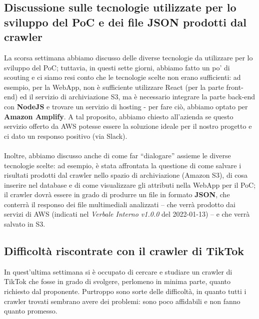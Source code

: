 \subsection{Discussione sulle tecnologie utilizzate per lo sviluppo del PoC e dei file JSON prodotti dal crawler}

La scorsa settimana abbiamo discusso delle diverse tecnologie da utilizzare per lo sviluppo del PoC; tuttavia, in questi sette giorni, abbiamo fatto un po' di scouting e ci siamo resi conto che le tecnologie scelte non erano sufficienti: ad esempio, per la WebApp, non è sufficiente utilizzare React (per la parte front-end) ed il servizio di archiviazione S3, ma è necessario integrare la parte back-end con \textbf{NodeJS} e trovare un servizio di hosting - per fare ciò, abbiamo optato per \textbf{Amazon Amplify}. A tal proposito, abbiamo chiesto all'azienda se questo servizio offerto da AWS potesse essere la soluzione ideale per il nostro progetto e ci dato un responso positivo (via Slack).
\\ \\
Inoltre, abbiamo discusso anche di come far “dialogare” assieme le diverse tecnologie scelte: ad esempio, è stata affrontata la questione di come salvare i risultati prodotti dal crawler nello spazio di archiviazione (Amazon S3), di cosa inserire nel database e di come visualizzare gli attributi nella WebApp per il PoC; il crawler dovrà essere in grado di produrre un file in formato \textbf{JSON}, che conterrà il responso dei file multimediali analizzati – che verrà prodotto dai servizi di AWS (indicati nel \textit{Verbale Interno v1.0.0} del 2022-01-13) – e che verrà salvato in S3.  

\subsection{Difficoltà riscontrate con il crawler di TikTok}

In quest'ultima settimana \MG{} si è occupato di cercare e studiare un crawler di TikTok che fosse in grado di svolgere, perlomeno in minima parte, quanto richiesto dal proponente. Purtroppo sono sorte delle difficoltà, in quanto tutti i crawler trovati sembrano avere dei problemi: sono poco affidabili e non fanno quanto promesso. 


